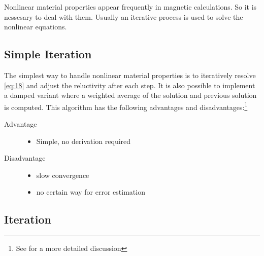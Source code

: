 Nonlinear material properties appear frequently in magnetic
calculations.  So it is nessesary to deal with them.  Usually an
iterative process is used to solve the nonlinear equations.

\subsection{Simple Iteration}
\label{sec:simple-iteration}

The simplest way to handle nonlinear material properties is to
iteratively resolve \eqref{eq:18} and adjust the reluctivity after each
step.  It is also possible to implement a damped variant where a
weighted average of the solution and previous solution is computed.
This algorithm has the following advantages and
disadvantages:\footnote{See \parencite[chapter 5]{Silvester:1996} for
  a more detailed discussion}
\begin{description}
\item[Advantage]
  \begin{itemize}
  \item Simple, no derivation required
  \end{itemize}
\item[Disadvantage]
  \begin{itemize}
  \item slow convergence
  \item no certain way for error estimation
  \end{itemize}
\end{description}


\subsection{ Iteration}
\label{sec:newton-iteration}

